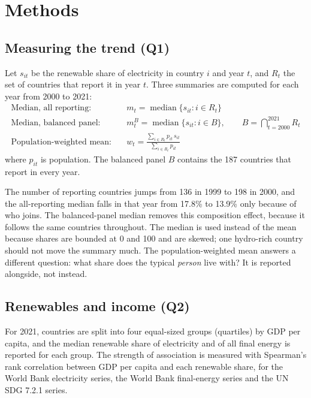 \documentclass[11pt,a4paper]{article}
\begin{document}
\section{Methods}\label{sec:methods}

\subsection{Measuring the trend (Q1)}
Let $s_{it}$ be the renewable share of electricity in country $i$ and year $t$, and $R_t$ the set of countries that report it in year $t$. Three summaries are computed for each year from 2000 to 2021:
\begin{align}
\text{Median, all reporting:}\quad & m_t = \operatorname{median}\{s_{it} : i \in R_t\} \\
\text{Median, balanced panel:}\quad & m^{B}_t = \operatorname{median}\{s_{it} : i \in B\}, \qquad B = \textstyle\bigcap_{t=2000}^{2021} R_t \\
\text{Population-weighted mean:}\quad & w_t = \frac{\sum_{i\in R_t} p_{it}\, s_{it}}{\sum_{i\in R_t} p_{it}}
\end{align}
where $p_{it}$ is population. The balanced panel $B$ contains the 187 countries that report in every year.

\begin{why}
The number of reporting countries jumps from 136 in 1999 to 198 in 2000, and the all-reporting median falls in that year from 17.8\% to 13.9\% only because of who joins. The balanced-panel median removes this composition effect, because it follows the same countries throughout. The median is used instead of the mean because shares are bounded at 0 and 100 and are skewed; one hydro-rich country should not move the summary much. The population-weighted mean answers a different question: what share does the typical \emph{person} live with? It is reported alongside, not instead.
\end{why}

\subsection{Renewables and income (Q2)}
For 2021, countries are split into four equal-sized groups (quartiles) by GDP per capita, and the median renewable share of electricity and of all final energy is reported for each group. The strength of association is measured with Spearman's rank correlation \citep{spearman1904} between GDP per capita and each renewable share, for the World Bank electricity series, the World Bank final-energy series and the UN SDG 7.2.1 series.
\end{document}
